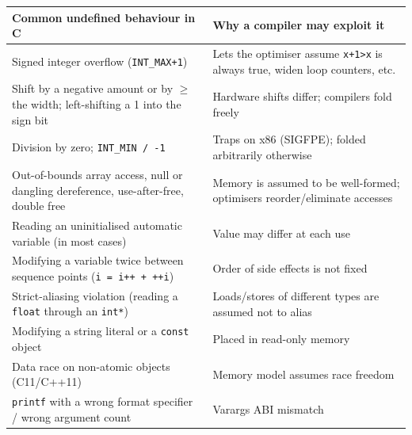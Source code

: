 \documentclass[10pt,a4paper,openany,oneside]{report}
\begin{document}
\begin{center}\small
\begin{xltabular}{\textwidth}{@{}L{5.6cm}Y@{}}
\toprule
\textbf{Common undefined behaviour in C} & \textbf{Why a compiler may exploit it}\\
\midrule\endhead
Signed integer overflow (\texttt{INT\_MAX+1}) & Lets the optimiser assume \texttt{x+1>x} is always true, widen loop counters, etc.\\
Shift by a negative amount or by $\ge$ the width; left-shifting a 1 into the sign bit & Hardware shifts differ; compilers fold freely\\
Division by zero; \texttt{INT\_MIN / -1} & Traps on x86 (SIGFPE); folded arbitrarily otherwise\\
Out-of-bounds array access, null or dangling dereference, use-after-free, double free & Memory is assumed to be well-formed; optimisers reorder/eliminate accesses\\
Reading an uninitialised automatic variable (in most cases) & Value may differ at each use\\
Modifying a variable twice between sequence points (\texttt{i = i++ + ++i}) & Order of side effects is not fixed\\
Strict-aliasing violation (reading a \texttt{float} through an \texttt{int*}) & Loads/stores of different types are assumed not to alias\\
Modifying a string literal or a \texttt{const} object & Placed in read-only memory\\
Data race on non-atomic objects (C11/C++11) & Memory model assumes race freedom\\
\texttt{printf} with a wrong format specifier / wrong argument count & Varargs ABI mismatch\\
\bottomrule
\end{xltabular}
\end{center}
\end{document}
